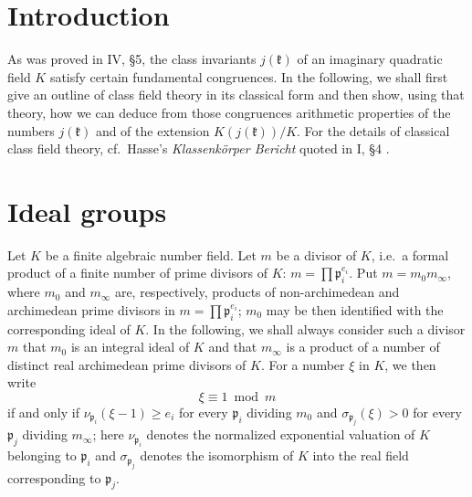 
\section{Introduction}

As was proved in IV, §5, the class invariants $j(\mathfrak{k})$ of an
imaginary quadratic field $K$ satisfy certain fundamental congruences. In
the following, we shall first give an outline of class field theory in
its classical form and then show, using that theory, how we can deduce
from those congruences arithmetic properties of the numbers
$j(\mathfrak{k})$ and of the extension $K(j(\mathfrak{k}))/K$. For the
details of classical class field theory, cf.\ Hasse's
\emph{Klassenk\"orper Bericht} quoted in I, §4 \cite{hasse1926bericht}.

\section{Ideal groups}

Let $K$ be a finite algebraic number field. Let $m$ be a divisor of $K$,
i.e.\ a formal product of a finite number of prime divisors of $K$:
$m=\prod\mathfrak{p}_{i}^{e_{i}}$. Put $m=m_{0}m_{\infty}$, where $m_{0}$
and $m_{\infty}$ are, respectively, products of non-archimedean and
archimedean prime divisors in $m=\prod\mathfrak{p}_{i}^{e_{i}}$; $m_{0}$
may be then identified with the corresponding ideal of $K$. In the
following, we shall always consider such a divisor $m$ that $m_{0}$ is an
integral ideal of $K$ and that $m_{\infty}$ is a product of a number of
distinct real archimedean prime divisors of $K$. For a number $\xi$ in
$K$, we then write
\[
\xi\equiv 1\bmod m
\]
if and only if $\nu_{\mathfrak{p}_{i}}(\xi-1)\geq e_{i}$ for every
$\mathfrak{p}_{i}$ dividing $m_{0}$ and $\sigma_{\mathfrak{p}_{j}}(\xi)>0$
for every $\mathfrak{p}_{j}$ dividing $m_{\infty}$; here
$\nu_{\mathfrak{p}_{i}}$ denotes the normalized exponential valuation of
$K$ belonging to $\mathfrak{p}_{i}$ and $\sigma_{\mathfrak{p}_{j}}$
denotes the isomorphism of $K$ into the real field corresponding to
$\mathfrak{p}_{j}$.

